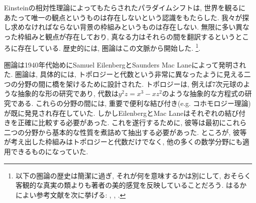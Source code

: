 Einsteinの相対性理論によってもたらされたパラダイムシフトは, 世界を観るにあたって唯一の観点というものは存在しないという認識をもたらした. 我々が探し求めなければならない背景の枠組みというものは存在しない. 無限に多い異なった枠組みと観点が存在しており, 真なる力はそれらの間を翻訳するというところに存在している. 歴史的には, 圏論はこの文脈から開始した.
\footnote{以下の圏論の歴史は簡潔に過ぎ, それが何を意味するかは別にして, おそらく客観的な真実の類よりも著者の美的感覚を反映していることだろう. はるかによい参考文献を次に挙げる: \cite{Kro}, \cite{Mar1}, \cite{LM}.}. 


圏論は1940年代始めにSamuel EilenbergとSaunders Mac Laneによって発明された. 圏論は, 具体的には, トポロジーと代数という非常に異なったように見える二つの分野の間に橋を架けるために設計された. トポロジーは, 例えば7次元球のような抽象的な形の研究であり, 代数は$y^2z=x^3-xz^2$のような抽象的な方程式の研究である. これらの分野の間には, 重要で便利な結び付き(e.g. コホモロジー理論)が既に発見され存在していた. しかしEilenbergとMac Laneはそれぞれの結び付きを正確に比較する必要があった. これを遂行するために, 彼等は最初にこれら二つの分野から基本的な性質を煮詰めて抽出する必要があった. ところが, 彼等が考え出した枠組みはトポロジーと代数だけでなく, 他の多くの数学分野にも適用できるものになっていた.


